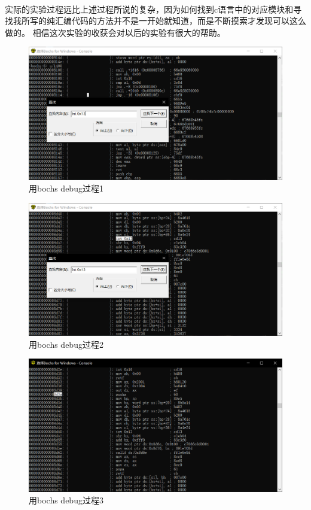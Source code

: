 \documentclass[a4paper, 11pt]{article} %
\begin{document}
\paragraph{}
实际的实验过程远比上述过程所说的复杂，因为如何找到c语言中的对应模块和寻找我所写的纯汇编代码的方法并不是一开始就知道，而是不断摸索才发现可以这么做的。
相信这次实验的收获会对以后的实验有很大的帮助。

\begin{figure}[H]
  \centering
  \includegraphics[width=0.8\linewidth]{bochsdbg1.png}
  \caption{用bochs debug过程1}
  \label{fig:bochsdbg1}
\end{figure}
\begin{figure}[H]
  \centering
  \includegraphics[width=0.8\linewidth]{bochsdbg2.png}
  \caption{用bochs debug过程2}
  \label{fig:bochsdbg2}
\end{figure}
\begin{figure}[H]
  \centering
  \includegraphics[width=0.8\linewidth]{bochsdbg3.png}
  \caption{用bochs debug过程3}
  \label{fig:bochsdbg3}
\end{figure}
\end{document}
